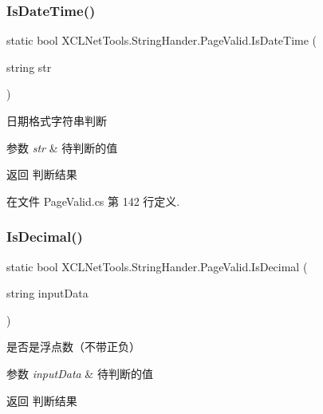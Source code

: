 \subsubsection{\texorpdfstring{Is\+Date\+Time()}{IsDateTime()}}
{\footnotesize\ttfamily static bool X\+C\+L\+Net\+Tools.\+String\+Hander.\+Page\+Valid.\+Is\+Date\+Time (\begin{DoxyParamCaption}\item[{string}]{str }\end{DoxyParamCaption})\hspace{0.3cm}{\ttfamily [static]}}



日期格式字符串判断 


\begin{DoxyParams}{参数}
{\em str} & 待判断的值\\
\hline
\end{DoxyParams}
\begin{DoxyReturn}{返回}
判断结果
\end{DoxyReturn}


在文件 Page\+Valid.\+cs 第 142 行定义.

\mbox{\label{class_x_c_l_net_tools_1_1_string_hander_1_1_page_valid_aa118db22190ca7a7821c56a6240d0faf}} 
\subsubsection{\texorpdfstring{Is\+Decimal()}{IsDecimal()}}
{\footnotesize\ttfamily static bool X\+C\+L\+Net\+Tools.\+String\+Hander.\+Page\+Valid.\+Is\+Decimal (\begin{DoxyParamCaption}\item[{string}]{input\+Data }\end{DoxyParamCaption})\hspace{0.3cm}{\ttfamily [static]}}



是否是浮点数（不带正负） 


\begin{DoxyParams}{参数}
{\em input\+Data} & 待判断的值\\
\hline
\end{DoxyParams}
\begin{DoxyReturn}{返回}
判断结果
\end{DoxyReturn}


